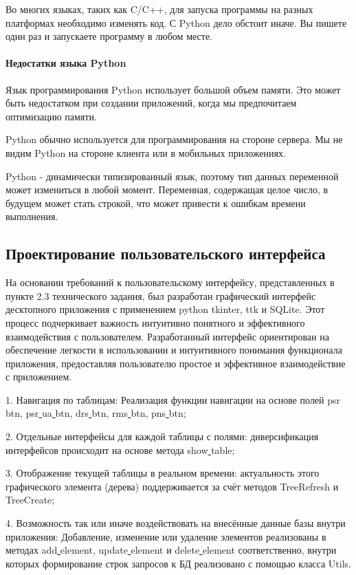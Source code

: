 Во многих языках, таких как C/C++, для запуска программы на разных платформах необходимо изменять код. С Python дело обстоит иначе. Вы пишете один раз и запускаете программу в любом месте.

\paragraph{Недостатки языка Python}

Язык программирования Python использует большой объем памяти. Это может быть недостатком при создании приложений, когда мы предпочитаем оптимизацию памяти.

Python обычно используется для программирования на стороне сервера. Мы не видим Python на стороне клиента или в мобильных приложениях.

Python - динамически типизированный язык, поэтому тип данных переменной может измениться в любой момент. Переменная, содержащая целое число, в будущем может стать строкой, что может привести к ошибкам времени выполнения.

\subsection{Проектирование пользовательского интерфейса}
На основании требований к пользовательскому интерфейсу, представленных в пункте 2.3 технического задания, был разработан графический интерфейс десктопного приложения с применением python tkinter, ttk и SQLite. Этот процесс подчеркивает важность интуитивно понятного и эффективного взаимодействия с пользователем. Разработанный интерфейс ориентирован на обеспечение легкости в использовании и интуитивного понимания функционала приложения, предоставляя пользователю простое и эффективное взаимодействие с приложением.

1. Навигация по таблицам: Реализация функции навигации на основе полей psr\underline{ }btn, psr\underline{ }ua\underline{ }btn, drs\underline{ }btn, rms\underline{ }btn, pns\underline{ }btn;

2. Отдельные интерфейсы для каждой таблицы с полями: диверсификация интерфейсов происходит на основе метода show\underline{ }table;

3. Отображение текущей таблицы в реальном времени: актуальность этого графического элемента (дерева) поддерживается за счёт методов TreeRefresh и TreeCreate;

4. Возможность так или иначе воздействовать на внесённые данные базы внутри приложения: Добавление, изменение или удаление элементов реализованы в методах add\underline{ }element, update\underline{ }element и delete\underline{ }element соответственно, внутри которых формирование строк запросов к БД реализовано с помощью класса Utils.

